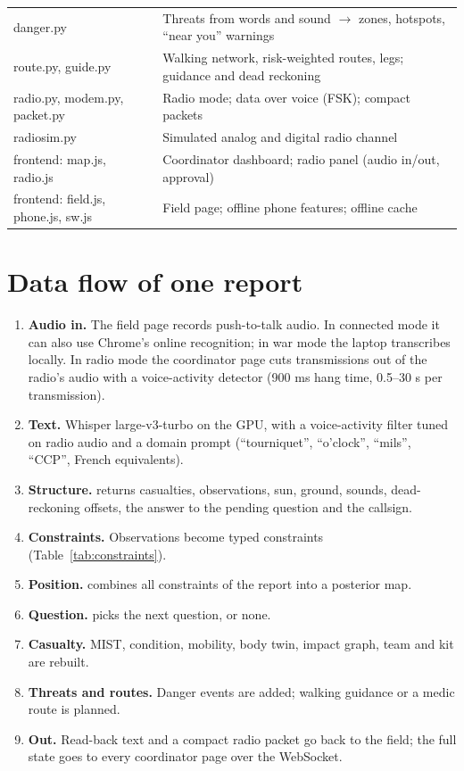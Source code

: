 \begin{table}[htbp]
\begin{tabularx}{\linewidth}{>{\ttfamily\raggedright}p{3.4cm}X}
danger.py & Threats from words and sound $\rightarrow$ zones, hotspots, ``near you'' warnings\\
route.py, guide.py & Walking network, risk-weighted routes, legs; guidance and dead reckoning\\
radio.py, modem.py, packet.py & Radio mode; data over voice (FSK); compact packets\\
radiosim.py & Simulated analog and digital radio channel\\
frontend: map.js, radio.js & Coordinator dashboard; radio panel (audio in/out, approval)\\
frontend: field.js, phone.js, sw.js & Field page; offline phone features; offline cache\\
\bottomrule
\end{tabularx}
\end{table}

\section{Data flow of one report}

\begin{enumerate}
  \item \textbf{Audio in.} The field page records push-to-talk audio. In connected mode it can also use
        Chrome's online recognition; in war mode the laptop transcribes locally. In radio mode the
        coordinator page cuts transmissions out of the radio's audio with a voice-activity detector
        (900 ms hang time, 0.5--30 s per transmission).
  \item \textbf{Text.} Whisper large-v3-turbo on the GPU, with a voice-activity filter tuned on radio audio
        and a domain prompt (``tourniquet'', ``o'clock'', ``mils'', ``CCP'', French equivalents).
  \item \textbf{Structure.}  returns casualties, observations, sun, ground, sounds,
        dead-reckoning offsets, the answer to the pending question and the callsign.
  \item \textbf{Constraints.} Observations become typed constraints (Table~\ref{tab:constraints}).
  \item \textbf{Position.}  combines all constraints of the report into a posterior map.
  \item \textbf{Question.}  picks the next question, or none.
  \item \textbf{Casualty.} MIST, condition, mobility, body twin, impact graph, team and kit are rebuilt.
  \item \textbf{Threats and routes.} Danger events are added; walking guidance or a medic route is planned.
  \item \textbf{Out.} Read-back text and a compact radio packet go back to the field; the full state goes to
        every coordinator page over the WebSocket.
\end{enumerate}

